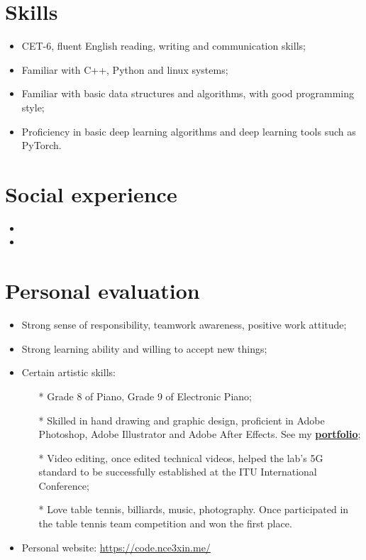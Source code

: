 \documentclass{resume}
\begin{document}
\section{Skills}
\begin{itemize}[parsep=0.5ex]
  \item CET-6, fluent English reading, writing and communication skills;
  \item Familiar with C++, Python and linux systems;
  \item Familiar with basic data structures and algorithms, with good programming style;
  \item Proficiency in basic deep learning algorithms and deep learning tools such as PyTorch.
\end{itemize}

\section{Social experience}
\begin{itemize}[parsep=0.5ex]
  \item {}
  \item {}
\end{itemize}

\section{Personal evaluation}
\begin{itemize}[parsep=0.5ex]
  \item Strong sense of responsibility, teamwork awareness, positive work attitude;
  \item Strong learning ability and willing to accept new things;
  \item Certain artistic skills:
  \begin{itemize}[parsep=0.5ex]
    \item[*] Grade 8 of Piano, Grade 9 of Electronic Piano;
    \item[*] Skilled in hand drawing and graphic design, proficient in Adobe Photoshop, Adobe Illustrator and Adobe After Effects. See my \href{https://nce3xin.github.io/design-portfolio/}{\textbf{portfolio}};
    \item[*] Video editing, once edited technical videos, helped the lab's 5G standard to be successfully established at the ITU International Conference;
    \item[*] Love table tennis, billiards, music, photography. Once participated in the table tennis team competition and won the first place.
  \end{itemize}
  \item Personal website: \href{https://code.nce3xin.me/}{https://code.nce3xin.me/}
\end{itemize}

%
%
\end{document}
